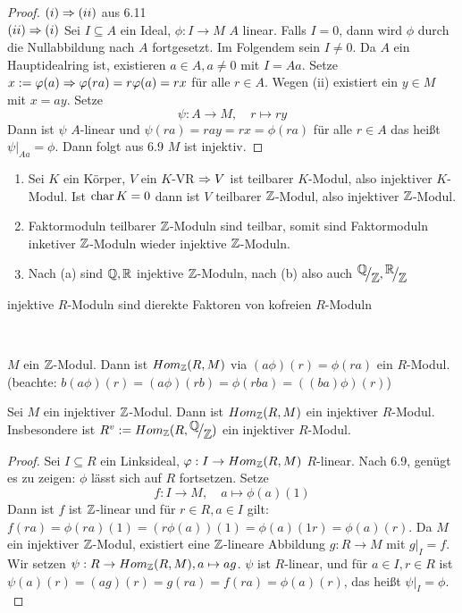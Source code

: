 \begin{proof}
	$(i) \Rightarrow (ii) $ aus 6.11 \\
	$(ii) \Rightarrow (i) $ Sei $ I \subseteq A $ ein Ideal, $\phi: I \to M $ $A$ linear. Falls $ I = 0 $, dann wird $\phi $ durch die Nullabbildung nach $A$ fortgesetzt. Im Folgendem sein $ I \neq 0 $. Da $A$ ein Hauptidealring ist, existieren $ a\in A, a\neq 0 $ mit $I =Aa$. Setze $ x:= \varphi(a) \Rightarrow \varphi(ra)=r\varphi(a) = rx $ für alle $ r \in A$. Wegen (ii) existiert ein $y \in M $ mit $ x = ay $. Setze $$\psi: A \to M,\quad  r \mapsto ry$$
	Dann ist $\psi$ $A$-linear und $ \psi(ra)=  ray = rx = \phi(ra) $ für alle $r \in A $ das heißt $\psi|_{Aa} = \phi.$ Dann folgt aus 6.9 $M$ ist injektiv. 
\end{proof}
\begin{bsp}
	\begin{enumerate} [label= \alph*)]
		\item Sei $K$ ein Körper, $V$ ein $K$-VR $\Rightarrow V$ ist teilbarer $K$-Modul, also injektiver $K$-Modul. Ist $\operatorname{char} K = 0 $ dann ist $V$ teilbarer $\mathbb{Z}$-Modul, also injektiver $\mathbb{Z}$-Modul. 
		\item Faktormoduln teilbarer $\mathbb{Z}$-Moduln sind teilbar, somit sind Faktormoduln inketiver $\mathbb{Z}$-Moduln wieder injektive $\mathbb{Z}$-Moduln. 
		\item Nach (a) sind $\mathbb{Q}, \mathbb{R} $ injektive $\mathbb{Z}$-Moduln, nach (b) also auch $\QR{\Q}{\Z}, \QR{\R}{\Z}$
	\end{enumerate}
\end{bsp}
\begin{Ziel}
	injektive $R$-Moduln sind dierekte Faktoren von kofreien $R$-Moduln 
\end{Ziel} \\
\begin{anm}
	$M$ ein $\mathbb{Z}$-Modul. Dann ist $Hom_{\mathbb{Z}}(R,M)$ via $(a\phi)(r) = \phi(ra) $ ein $R$-Modul. (beachte: $b(a\phi)(r) = (a\phi)(rb) = \phi(rba) = ((ba)\phi)(r) $)
\end{anm}
\begin{bem}
	Sei $M$ ein injektiver $\mathbb{Z}$-Modul. Dann ist $Hom_{\mathbb{Z}}(R,M)$ ein injektiver $R$-Modul. Insbesondere ist $R^{v} := Hom_{\Z}(R, \QR{\Q}{\Z}) $ ein injektiver $R$-Modul.
\end{bem}
\begin{proof}
	Sei $ I \subseteq R $ ein Linksideal, $\varphi: I \to Hom_{\mathbb{Z}}(R,M) $ $R$-linear. Nach 6.9, genügt es zu zeigen: $\phi$ lässt sich auf $R$ fortsetzen. Setze $$f: I \to M ,\quad a \mapsto \phi(a)(1)$$ Dann ist $f $ ist $\mathbb{Z}$-linear und für $r \in R , a \in I $ gilt: $ f(ra) = \phi(ra)(1)= (r\phi(a))(1) = \phi(a)(1 r) = \phi(a)(r)$. Da $M$ ein injektiver $\mathbb{Z}$-Modul, existiert eine $\mathbb{Z}$-lineare Abbildung $g: R \to M $ mit $g\big|_I=f $. Wir setzen $\psi: R \to Hom_{\mathbb{Z}}(R,M), a \mapsto ag $. $\psi$ ist $R$-linear, und für $a\in I, r \in R $ ist $\psi(a)(r) =(ag)(r) = g(ra) = f(ra) = \phi(a)(r)$, das heißt $\psi\big|_{I}=\phi.$
\end{proof}
